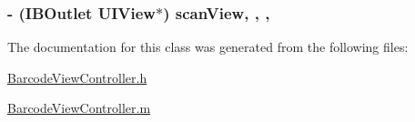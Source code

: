\subsubsection[{scan\+View}]{\setlength{\rightskip}{0pt plus 5cm}-\/ (I\+B\+Outlet U\+I\+View$\ast$) scan\+View\hspace{0.3cm}{\ttfamily [read]}, {\ttfamily [write]}, {\ttfamily [nonatomic]}, {\ttfamily [strong]}}\label{interface_barcode_view_controller_a2733f3e6e1c326d62321ba509d39bb6f}


The documentation for this class was generated from the following files\+:\begin{DoxyCompactItemize}
\item 
\hyperlink{_barcode_view_controller_8h}{Barcode\+View\+Controller.\+h}\item 
\hyperlink{_barcode_view_controller_8m}{Barcode\+View\+Controller.\+m}\end{DoxyCompactItemize}
